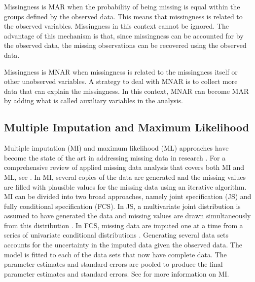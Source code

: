 \documentclass[man]{apa7}\usepackage[]{graphicx}\usepackage[]{xcolor}
\begin{document}
Missingness is MAR when the probability of being missing
is equal within the groups defined by the observed data.
This means that missingness is related to the observed variables.
Missingness in this context cannot be ignored.
The advantage of this mechanism is that,
since missingness can be accounted for by the observed data,
the missing observations can be recovered using the observed data.

Missingness is MNAR when missingness
is related to the missingness itself or other unobserved variables.
A strategy to deal with MNAR
is to collect more data that can explain the missingness.
In this context,
MNAR can become MAR
by adding what is called auxiliary variables in the analysis.

\subsection{Multiple Imputation and Maximum Likelihood}

Multiple imputation (MI) and maximum likelihood (ML) approaches
have become the state of the art
in addressing missing data in research
\parencite{Lib-Missing-Data-Schafer-2002}.
For a comprehensive review of applied missing data analysis
that covers both MI and ML,
see
\Textcite{Lib-Missing-Data-Books-Enders-2010}.
In MI,
several copies of the data are generated
and the missing values are filled
with plausible values for the missing data using an iterative algorithm.
MI can be divided into two broad approaches,
namely joint specification (JS) and fully conditional specification (FCS).
In JS,
a multivariate joint distribution is assumed to have generated the data
and missing values are drawn simultaneously from this distribution
\parencite{Lib-Missing-Data-Books-Rubin-1987,
Lib-Missing-Data-Books-Schafer-1997}.
In FCS,
missing data are imputed one at a time
from a series of univariate conditional distributions 
\parencite{Lib-Missing-Data-Multiple-Imputation-Raghunathan-2001,
Lib-Missing-Data-Multiple-Imputation-vanBuuren-2006}.
Generating several data sets accounts for the uncertainty
in the imputed data given the observed data.
The model is fitted to each of the data sets that now have complete data.
The parameter estimates and standard errors
are pooled to produce the final parameter estimates and standard errors.
See
\Textcite{Lib-Missing-Data-Books-Little-2019,
Lib-Missing-Data-Books-vanBuuren-2018}
for more information on MI.
\end{document}
